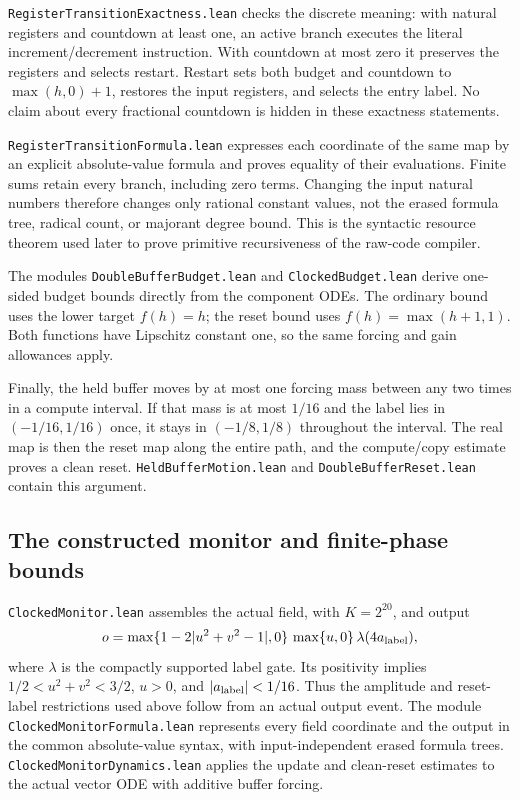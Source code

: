 \documentclass[11pt]{article}
\newcommand{\code}[1]{{\small\nolinkurl{#1}}}
\begin{document}
\code{RegisterTransitionExactness.lean} checks the discrete meaning:
with natural registers and countdown at least one, an active branch
executes the literal increment/decrement instruction. With countdown at
most zero it preserves the registers and selects restart. Restart sets
both budget and countdown to $\max(h,0)+1$, restores the input registers,
and selects the entry label. No claim about every fractional countdown
is hidden in these exactness statements.

\code{RegisterTransitionFormula.lean} expresses each coordinate of the
same map by an explicit absolute-value formula and proves equality of
their evaluations. Finite sums retain every branch, including zero
terms. Changing the input natural numbers therefore changes only
rational constant values, not the erased formula tree, radical count,
or majorant degree bound. This is the syntactic resource theorem used
later to prove primitive recursiveness of the raw-code compiler.

The modules \code{DoubleBufferBudget.lean} and \code{ClockedBudget.lean}
derive one-sided budget bounds directly from the component ODEs. The
ordinary bound uses the lower target $f(h)=h$; the reset bound uses
$f(h)=\max(h+1,1)$. Both functions have Lipschitz constant one, so the
same forcing and gain allowances apply.

Finally, the held buffer moves by at most one forcing mass between any
two times in a compute interval. If that mass is at most $1/16$ and the
label lies in $(-1/16,1/16)$ once, it stays in $(-1/8,1/8)$ throughout
the interval. The real map is then the reset map along the entire path,
and the compute/copy estimate proves a clean reset.
\code{HeldBufferMotion.lean} and \code{DoubleBufferReset.lean} contain
this argument.

\subsection{The constructed monitor and finite-phase bounds}

\code{ClockedMonitor.lean} assembles the actual field, with
$K=2^{20}$, and output
\[
 o=\max\{1-2|u^2+v^2-1|,0\}\,\max\{u,0\}\,\lambda(4a_{\rm label}),
\]
where $\lambda$ is the compactly supported label gate. Its positivity
implies $1/2<u^2+v^2<3/2$, $u>0$, and
$|a_{\rm label}|<1/16$. Thus the amplitude and reset-label restrictions
used above follow from an actual output event. The module
\code{ClockedMonitorFormula.lean} represents every field coordinate and
the output in the common absolute-value syntax, with input-independent
erased formula trees. \code{ClockedMonitorDynamics.lean} applies the
update and clean-reset estimates to the actual vector ODE with additive
buffer forcing.
\end{document}
